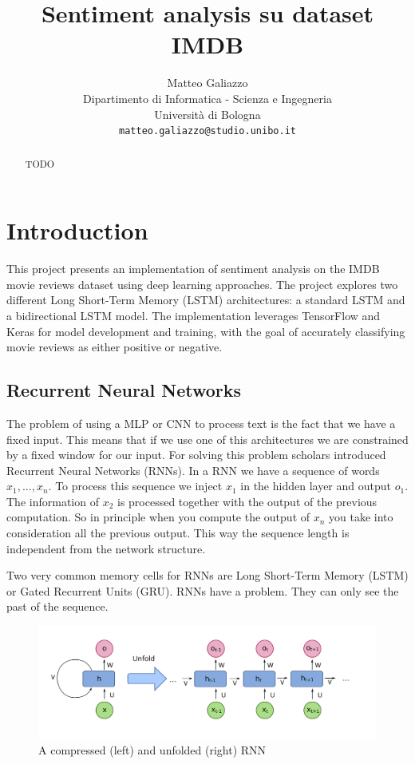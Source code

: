 \documentclass{article}
\title{Sentiment analysis su dataset IMDB}
\author{
 Matteo Galiazzo \\
  Dipartimento di Informatica - Scienza e Ingegneria\\
  Università di Bologna\\
  \texttt{matteo.galiazzo@studio.unibo.it} \\
}
\begin{document}
\maketitle
\begin{abstract}
TODO
\end{abstract}



\section{Introduction}

This project presents an implementation of sentiment analysis on the IMDB movie reviews dataset using deep learning approaches.
The project explores two different Long Short-Term Memory (LSTM) architectures: a standard LSTM and a bidirectional LSTM model.
The implementation leverages TensorFlow and Keras for model development and training, with the goal of accurately classifying movie reviews as either positive or negative.

\subsection{Recurrent Neural Networks}

The problem of using a MLP or CNN to process text is the fact that we have a fixed input.
This means that if we use one of this architectures we are constrained by a fixed window for our input.
For solving this problem scholars introduced Recurrent Neural Networks (RNNs).
In a RNN we have a sequence of words $x_1, ..., x_n$.
To process this sequence we inject $x_1$ in the hidden layer and output $o_1$.
The information of $x_2$ is processed together with the output of the previous computation.
So in principle when you compute the output of $x_n$ you take into consideration all the previous output.
This way the sequence length is independent from the network structure.

Two very common memory cells for RNNs are Long Short-Term Memory (LSTM) or Gated Recurrent Units (GRU).
RNNs have a problem. They can only see the past of the sequence.

\begin{figure}[htbp]
  \centering
  \includegraphics[width=0.8\linewidth]{img/rnn_unfolded.png}
  \caption{A compressed (left) and unfolded (right) RNN}
  \label{fig:rnn_unfolded}
\end{figure}
\end{document}
